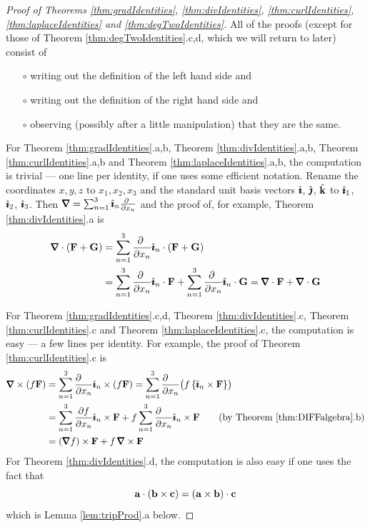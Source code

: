 \begin{proof}[Proof of Theorems \ref{thm:gradIdentities},
                        \ref{thm:divIdentities},
                        \ref{thm:curlIdentities},
                        \ref{thm:laplaceIdentities} and
                        \ref{thm:degTwoIdentities}]
All of the proofs (except for those of Theorem \ref{thm:degTwoIdentities}.c,d, 
which we will return to later)
consist of 
\begin{itemize}\itemsep1pt \parskip0pt  %
\item[$\circ$]
writing out the definition of the left hand side and
\item[$\circ$]
writing out the definition of the right hand side and
\item[$\circ$]
observing (possibly after a little manipulation) that they are the same.
\end{itemize}
For Theorem \ref{thm:gradIdentities}.a,b,
    Theorem \ref{thm:divIdentities}.a,b,
    Theorem \ref{thm:curlIdentities}.a,b and
    Theorem \ref{thm:laplaceIdentities}.a,b,
the computation is trivial --- one line per identity,
if one uses some efficient notation. Rename the coordinates $x,y,z$
to $x_1,x_2,x_3$ and the standard unit basis vectors $\hat{\pmb{\imath}}$, $\hat{\pmb{\jmath}}$, $\hat{\mathbf{k}}$
to $\hat{\pmb{\imath}}_1$, $\hat{\pmb{\imath}}_2$, $\hat{\pmb{\imath}}_3$. Then 
$\vnabla = \sum_{n=1}^3\hi_n\frac{\partial\ }{\partial x_n}$ and
the proof of, for example, Theorem \ref{thm:divIdentities}.a is
\begin{align*}
\vnabla\cdot(\vF+\vG)
&=\sum_{n=1}^3\frac{\partial\ }{\partial x_n} \hi_n\cdot(\vF+\vG) \\
&=\sum_{n=1}^3\frac{\partial\ }{\partial x_n} \hi_n\cdot\vF
+\sum_{n=1}^3\frac{\partial\ }{\partial x_n} \hi_n\cdot\vG
=\vnabla\cdot\vF+\vnabla \cdot\vG
\end{align*}

\bigskip
\noindent 
For Theorem \ref{thm:gradIdentities}.c,d,
     Theorem \ref{thm:divIdentities}.c,
     Theorem \ref{thm:curlIdentities}.c and
     Theorem \ref{thm:laplaceIdentities}.c, 
the computation is easy --- a few lines per identity.
For example, the proof of Theorem \ref{thm:curlIdentities}.c is
\begin{align*}
\vnabla\times(f\vF)
&=\sum_{n=1}^3\frac{\partial\hfill}{\partial x_n}\hi_n\times(f \vF)
=\sum_{n=1}^3\frac{\partial\hfill}{\partial x_n}\big(f\, \{\hi_n\times\vF\}\big)
\\
&=\sum_{n=1}^3\frac{\partial f}{\partial x_n}\hi_n\times\vF
+f\sum_{n=1}^3\frac{\partial\hfill}{\partial x_n}\hi_n\times\vF 
\qquad\text{(by Theorem \ref{thm:DIFFalgebra}.b)}\\
&=(\vnabla f)\times\vF + f\,\vnabla\times\vF
\end{align*}
For Theorem \ref{thm:divIdentities}.d, the computation is also easy if 
one uses the fact that  
\begin{equation*}
\mathbf{a}\cdot(\mathbf{b}\times\mathbf{c})=(\mathbf{a}\times\mathbf{b})\cdot\mathbf{c}
\end{equation*} 
which is Lemma \ref{lem:tripProd}.a below.


\end{proof}
